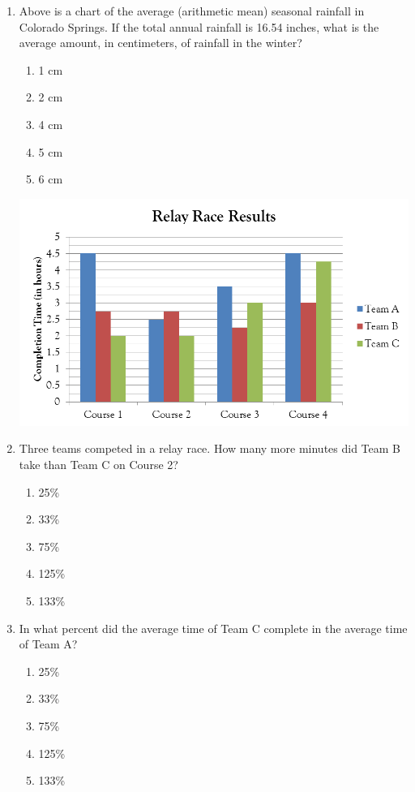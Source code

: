 \begin{enumerate}
\item \medium

Above is a chart of the average (arithmetic mean) seasonal rainfall in Colorado Springs. If the total annual rainfall is 16.54 inches, what is the average amount, in centimeters, of rainfall in the winter?

\begin{enumerate}[label=(\Alph*)]
\item 1 cm
\item 2 cm
\item 4 cm
\item 5 cm
\item 6 cm
\end{enumerate}

\vfill
\newpage
\centerline{\includegraphics{59}}

\item \medium

Three teams competed in a relay race. How many more minutes did Team B take than Team C on Course 2?

\begin{enumerate}[label=(\Alph*)]
\item 25\%
\item 33\%
\item 75\%
\item 125\%
\item 133\%
\end{enumerate}

\vfill
\item \advanced

In what percent did the average time of Team C complete in the average time of Team A?

\begin{enumerate}[label=(\Alph*)]
\item 25\%
\item 33\%
\item 75\%
\item 125\%
\item 133\%
\end{enumerate}


\end{enumerate}
